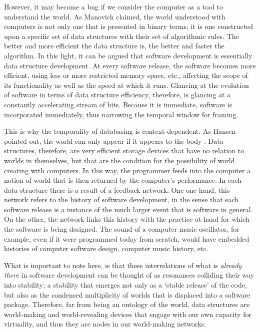 However, it may become a bug if we consider the computer as a tool to understand the world. As Manovich claimed, the world understood with computers is not only one that is presented in binary terms, it is one constructed upon a specific set of data structures with their set of algorithmic rules. The better and more efficient the data structure is, the better and faster the algorithm. In this light, it can be argued that software development is essentially data structure development. At every software release, the software becomes more efficient, using less or more restricted memory space, etc., affecting the scope of its functionality as well as the speed at which it runs. Glancing at the evolution of software in terms of data structure efficiency, therefore, is glancing at a constantly accelerating stream of bits. Because it is immediate, software is incorporated immediately, thus narrowing the temporal window for framing.

This is why the temporality of databasing is context-dependent. As Hansen pointed out, the world can only appear if it appears to the body . Data structures, therefore, are very efficient storage devices that have no relation to worlds in themselves, but that are the condition for the possibility of world creating with computers. In this way, the programmer feeds into the computer a notion of world that is then returned by the computer's performance. In each data structure there is a result of a feedback network. One one hand, this network refers to the history of software development, in the sense that each software release is a instance of the much larger event that is software in general. On the other, the network links this history with the practice at hand for which the software is being designed. The sound of a computer music oscillator, for example, even if it were programmed today from scratch, would have embedded histories of computer software design, computer music history, etc.

What is important to note here, is that these interrelations of what is \textit{already there} in software development can be thought of as resonances colliding their way into stability; a stability that emerges not only as a `stable release' of the code, but also as the condensed multiplicity of worlds that is displaced into a software package. Therefore, far from being an ontology of the world, data structures are world-making and world-revealing devices that engage with our own capacity for virtuality, and thus they are nodes in our world-making networks.



